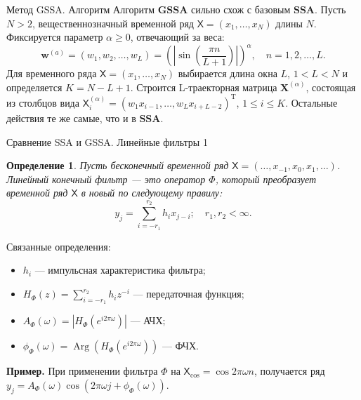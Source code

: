\documentclass[notheorems, handout]{beamer}
\newtheorem{comment}{Замечание} %
\newtheorem{definition}{Определение}
\newcommand{\SSA}{\textbf{SSA}}
\newcommand{\GSSA}{\textbf{GSSA}}
\newcommand{\TS}{\mathsf{X}}
\begin{document}
	
	\begin{frame}{Метод GSSA. Алгоритм}
		Алгоритм $\GSSA$ сильно схож с базовым $\SSA$. Пусть $N > 2$, вещественнозначный временной ряд
		$\TS = (x_1, \dots, x_{N})$ длины $N$. Фиксируется параметр $\alpha \geq 0$, отвечающий за веса:
		\begin{equation*}
			{\boldsymbol{w}}^{(a)} = (w_{1}, w_{2}, \ldots, w_{L}) = \left( \left| \sin\left(\frac{\pi n}{L+1}\right) \right| \right)^\alpha, \quad n = 1, 2, \dots, L.
		\end{equation*}
		Для временного ряда $\TS = (x_1, \dots, x_{N})$ выбирается длина окна $L$, $1 < L < N$ и определяется $K = N - L + 1$. Строится L-траекторная матрица $\mathbf{X}^{(\alpha)}$, состоящая из столбцов вида $\TS_i^{(\alpha)} = ( w_1 x_{i-1}, \ldots, w_L x_{i+L-2})^{\mathrm{T}}$,
		$1 \leq i \leq K$. 
		\newline \newline
		Остальные действия те же самые, что и в $\SSA$.
		

	\end{frame}
	
	
	\begin{frame}{Сравнение SSA и GSSA. Линейные фильтры 1}
		\begin{definition}
			Пусть бесконечный временной ряд $\TS = (\dots, x_{-1}, x_0, x_1, \dots)$. Линейный конечный фильтр --- это оператор $\Phi$, который преобразует временной ряд $\TS$ в новый по следующему правилу:
			\begin{equation*}
				y_j = \sum \limits_{i = -r_1}^{r_2} h_i x_{j-i}; \quad r_1, r_2 < \infty.
			\end{equation*}
		\end{definition} 
		Связанные определения:
		\begin{itemize}
			\item ${h_i}$ --- импульсная характеристика фильтра;
			\item 		$H_{\Phi}(z) = \sum \limits_{i = -r_1}^{r_2} h_i z^{-i}$ --- передаточная функция;
			\item $A_{\Phi}(\omega) = \left| H_{\Phi}\left(e^{i2\pi\omega}\right) \right|$ --- АЧХ;
			\item $\phi_{\Phi}(\omega) = \operatorname{Arg}\left(H_{\Phi}\left(e^{i2\pi\omega}\right)\right)$ --- ФЧХ.
		\end{itemize}
		\textbf{\large{Пример.}} При применении фильтра $\Phi$ на $\TS_{\cos} = \cos{2\pi \omega n}$, получается ряд
		$y_j = A_{\Phi}(\omega) \cos\left(2\pi\omega j + \phi_{\Phi}(\omega) \right)$.
	\end{frame}
	
\end{document}
